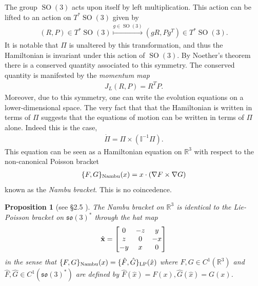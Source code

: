 \documentclass[12pt]{amsart}
\newcommand{\so}{\ensuremath{\mathfrak{so}}}
\newtheorem{prop}[thm]{Proposition}
\DeclareMathOperator{\SO}{SO}
\begin{document}
  The group $\SO(3)$ acts upon itself by left multiplication.
  This action can be lifted to an action on $T^{\ast}\SO(3)$ given by
  \begin{align*}
    (R,P) \in T^{\ast}\SO(3) \stackrel{g \in \SO(3) }{\mapsto}
    (g R , P g^T ) \in T^{\ast} \SO(3).
  \end{align*}
  It is notable that $\Pi$ is unaltered by this transformation,
  and thus the Hamiltonian is invariant under this action of $\SO(3)$.
  By Noether's theorem there is a conserved quantity associated to 
  this symmetry.
  The conserved quantity is manifested by the \emph{momentum map}
  \begin{align*}
    J_L(R,P) = R^T P .
  \end{align*}
  Moreover, due to this symmetry, one can write the evolution equations
  on a lower-dimensional space.
  The very fact that that the Hamiltonian is written in terms of $\Pi$
  suggests that the equations of motion can be written in terms of $\Pi$ alone.
  Indeed this is the case,
  \begin{align}
    \dot{\Pi} = \Pi \times (\mathbb{I}^{-1} \Pi ). \label{eq:rigid_body}
  \end{align}
  This equation can be seen as a Hamiltonian equation on $\mathbb{R}^3$
  with respect to the non-canonical Poisson bracket
  \begin{align}
    \{ F , G \}_{\rm Nambu}(x)  = x \cdot (\nabla F \times \nabla G) \label{eq:Nambu}
  \end{align}
  known as the \emph{Nambu bracket}.
  This is no coincedence.
  \begin{prop}[see \S 2.5 \cite{HolmBook2}] \label{prop:Nambu}
    The Nambu bracket on $\mathbb{R}^3$
    is identical to the Lie-Poisson bracket on $\so(3)^*$ 
    through  the hat map
    \begin{align*}
      \hat{ \bf x } =
      \begin{bmatrix}
        0 & -z & y \\
        z & 0 & -x \\
        -y & x & 0 
      \end{bmatrix}
    \end{align*}
    in the sense that $\{ F,G\}_{\rm Nambu}( x) = \{ \hat{F} , \hat{G} \}_{\rm LP}( \hat{x})$
    where $F,G \in C^1(\mathbb{R}^3)$ and 
    $\hat{F},\hat{G} \in C^1(\so(3)^*)$ are defined by 
    $\hat{F}( \hat{x} ) = F(x), \hat{G}( \hat{x} ) = G(x)$.
  \end{prop}
\end{document}
